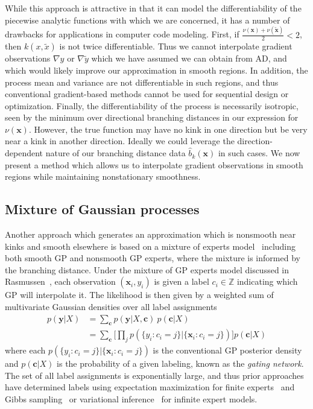 \documentclass{article}
\renewcommand{\vec}[1]{\mathbf{#1}}
\newcommand{\Z}{\mathbb{Z}}
\begin{document}
While this approach is attractive in that it can model the differentiability of the piecewise analytic functions with which we are concerned, it has a number of drawbacks for applications in computer code modeling. First, if $\frac{\nu(\vec{x}) + \nu(\tilde{\vec{x}})}{2} < 2$, then $k(x, \tilde{x})$ is not twice differentiable. Thus we cannot interpolate gradient observations $\nabla y$ or $\nabla \tilde{y}$ which we have assumed we can obtain from AD, and which would likely improve our approximation in smooth regions. In addition, the process mean and variance are not differentiable in such regions, and thus conventional gradient-based methods cannot be used for sequential design or optimization. Finally, the differentiability of the process is necessarily isotropic, seen by the minimum over directional branching distances in our expression for $\nu(\vec{x})$. However, the true function may have no kink in one direction but be very near a kink in another direction. Ideally we could leverage the direction-dependent nature of our branching distance data $\hat{b}_k(\vec{x})$ in such cases. We now present a method which allows us to interpolate gradient observations in smooth regions while maintaining nonstationary smoothness.

\subsection{Mixture of Gaussian processes}
Another approach which generates an approximation which is nonsmooth near kinks and smooth elsewhere is based on a mixture of experts model~\cite{jacobs1991adaptive} including both smooth GP and nonsmooth GP experts, where the mixture is informed by the branching distance. Under the mixture of GP experts model discussed in Rasmussen~\cite{rasmussen2002infinite}, each observation $(\vec{x}_i, y_i)$ is given a label $c_i \in \Z$ indicating which GP will interpolate it. The likelihood is then given by a weighted sum of multivariate Gaussian densities over all label assignments
\begin{align*}
  p(\vec{y} | X) & = \sum_\vec{c} p(\vec{y} | X, \vec{c}) \ p(\vec{c} | X) \\
  & = \sum_\vec{c} \bigg[ \prod_{j} p(\{y_i : c_i = j \} | \{\vec{x}_i : c_i = j \}) \bigg] p(\vec{c} | X)
\end{align*}
where each $p(\{y_i : c_i = j \} | \{\vec{x}_i : c_i = j \})$ is the conventional GP posterior density and $p(\vec{c} | X)$ is the probability of a given labeling, known as the \textit{gating network}. The set of all label assignments is exponentially large, and thus prior approaches have determined labels using expectation maximization for finite experts~\cite{tresp2001mixtures} and Gibbs sampling~\cite{meeds2006alternative} or variational inference~\cite{yuan2009variational} for infinite expert models.
\end{document}

